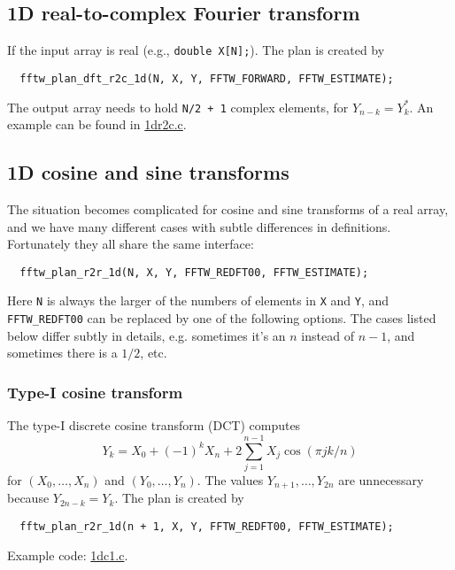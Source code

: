 \documentclass[12pt]{article}
\begin{document}
\subsection{1D real-to-complex Fourier transform}

If the input array is real (e.g., \texttt{double X[N];}).
%
The plan is created by
\begin{verbatim}
  fftw_plan_dft_r2c_1d(N, X, Y, FFTW_FORWARD, FFTW_ESTIMATE);
\end{verbatim}
%
The output array needs to hold \texttt{N/2 + 1} complex elements,
for $Y_{n - k} = Y_k^*$.
%
An example can be found in \url{1dr2c.c}.




\subsection{1D cosine and sine transforms}

The situation becomes complicated for cosine and sine transforms of
  a real array,
  and we have many different cases with subtle differences in definitions.
%
Fortunately they all share the same interface:
\begin{verbatim}
  fftw_plan_r2r_1d(N, X, Y, FFTW_REDFT00, FFTW_ESTIMATE);
\end{verbatim}
Here \texttt{N} is always the larger of
  the numbers of elements in \texttt{X} and \texttt{Y},
and
\texttt{FFTW\_REDFT00} can be replaced by one of the following options.
%
The cases listed below differ subtly in details,
  e.g. sometimes it's an $n$ instead of $n-1$,
  and sometimes there is a $1/2$, etc.





\subsubsection{Type-I cosine transform}
The type-I discrete cosine transform (DCT) computes
\begin{equation}
  Y_k = X_0 + (-1)^k X_{n}
  + 2 \sum_{j = 1}^{n - 1} X_j \cos(\pi j k / n)
\end{equation}
for $(X_0, \dots, X_n)$ and $(Y_0, \dots, Y_n)$.
%
The values $Y_{n+1}, \dots, Y_{2n}$ are unnecessary because $Y_{2n - k} = Y_k$.
%
The plan is created by
\begin{verbatim}
  fftw_plan_r2r_1d(n + 1, X, Y, FFTW_REDFT00, FFTW_ESTIMATE);
\end{verbatim}
Example code: \url{1dc1.c}.
\end{document}

